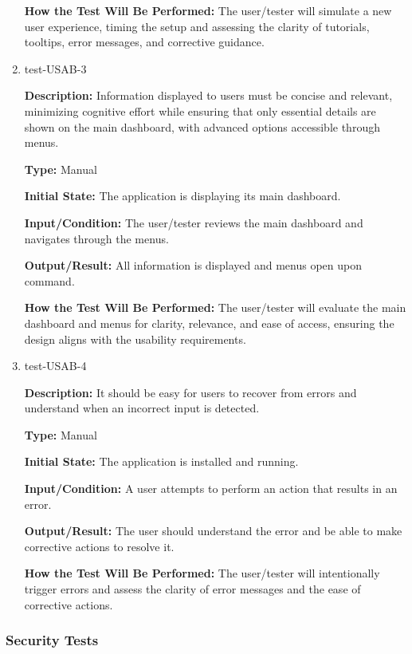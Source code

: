 \documentclass[12pt, titlepage]{article}
\begin{document}
\begin{enumerate}
\textbf{How the Test Will Be Performed:} The user/tester will simulate a new
user experience, timing the setup and assessing the clarity of tutorials,
tooltips, error messages, and corrective guidance.

\item{test-USAB-3\\}

\textbf{Description:} Information displayed to users must be concise and
relevant, minimizing cognitive effort while ensuring that only essential details
are shown on the main dashboard, with advanced options accessible through menus.

\textbf{Type:} Manual
					
\textbf{Initial State:} The application is displaying its main dashboard.
					
\textbf{Input/Condition:} The user/tester reviews the main dashboard and
navigates through the menus.
					
\textbf{Output/Result:} All information is displayed and menus open upon
command.
					
\textbf{How the Test Will Be Performed:} The user/tester will evaluate the main
dashboard and menus for clarity, relevance, and ease of access, ensuring the
design aligns with the usability requirements.

\item{test-USAB-4\\}

\textbf{Description:} It should be easy for users to recover from errors and
understand when an incorrect input is detected.

\textbf{Type:} Manual
					
\textbf{Initial State:} The application is installed and running.
					
\textbf{Input/Condition:} A user attempts to perform an action that results in
an error.
					
\textbf{Output/Result:} The user should understand the error and be able to
make corrective actions to resolve it.
					
\textbf{How the Test Will Be Performed:} The user/tester will intentionally
trigger errors and assess the clarity of error messages and the ease of
corrective actions.

\end{enumerate}

\subsubsection{Security Tests}
\end{document}
